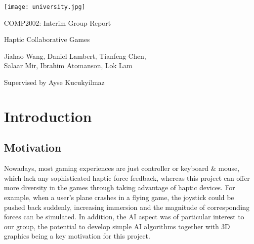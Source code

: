 \documentclass[a4paper]{article}
\begin{document}


\begin{titlepage}
   \begin{center}
        \texttt{[image: university.jpg]}
        \vspace*{2cm}

        \huge
        COMP2002: Interim Group Report
        
        \vspace{0.3cm}
        
        \LARGE
        Haptic Collaborative Games
            
        \vspace{2cm}

        \Large
        Jiahao Wang, Daniel Lambert, Tianfeng Chen, \protect\\ Salaar Mir, Ibrahim Atomanson, Lok Lam 
       
        \vspace{1cm}
       
        Supervised by Ayse Kucukyilmaz
   \end{center}
\end{titlepage}


\tableofcontents
\clearpage


\section{Introduction}
\subsection{Motivation}
Nowadays, most gaming experiences are just controller or keyboard \& mouse, which lack any sophisticated haptic force feedback, whereas this project can offer more diversity in the games through taking advantage of haptic devices. For example, when a user's plane crashes in a flying game, the joystick could be pushed back suddenly, increasing immersion and the magnitude of corresponding forces can be simulated. In addition, the AI aspect was of particular interest to our group, the potential to develop simple AI algorithms together with 3D graphics being a key motivation for this project.
\end{document}

